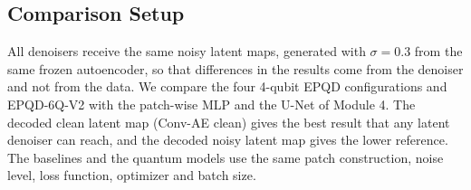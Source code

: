 \subsection{Comparison Setup}
All denoisers receive the same noisy latent maps, generated with $\sigma=0.3$ from the same frozen autoencoder, so that differences in the results come from the denoiser and not from the data. We compare the four 4-qubit EPQD configurations and EPQD-6Q-V2 with the patch-wise MLP and the U-Net of Module 4. The decoded clean latent map (Conv-AE clean) gives the best result that any latent denoiser can reach, and the decoded noisy latent map gives the lower reference. The baselines and the quantum models use the same patch construction, noise level, loss function, optimizer and batch size.
